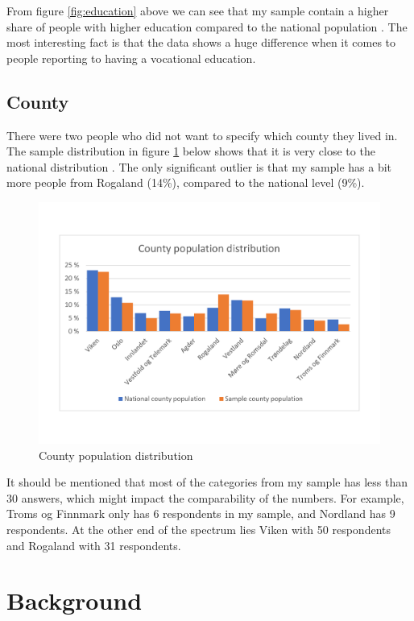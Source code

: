 From figure \ref{fig:education} above we can see that my sample contain a higher share of people with higher education compared to the national population \cite{SSB_education}. The most interesting fact is that the data shows a huge difference when it comes to people reporting to having a vocational education. 

\subsection{County}
There were two people who did not want to specify which county they lived in. The sample distribution in figure \ref{fig:county} below shows that it is very close to the national distribution \cite{SSB_befolkning}. The only significant outlier is that my sample has a bit more people from Rogaland (14\%), compared to the national level (9\%).
\begin{figure}[!h]
    \centering
    \includegraphics[scale=0.45]{figures/diagrams/county_ssb.pdf}
    \caption{County population distribution}
    \label{fig:county}
\end{figure}

It should be mentioned that most of the categories from my sample has less than 30 answers, which might impact the comparability of the numbers. For example, Troms og Finnmark only has 6 respondents in my sample, and Nordland has 9 respondents. At the other end of the spectrum lies Viken with 50 respondents and Rogaland with 31 respondents. 

\section{Background}

